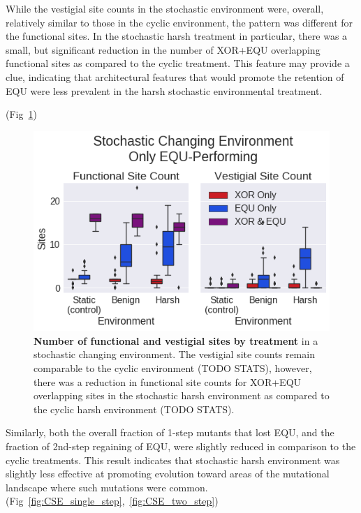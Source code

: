 \documentclass[10pt,letterpaper]{article}
\begin{document}
While the vestigial site counts in the stochastic environment were, overall, relatively similar to those in the cyclic environment, the pattern was different for the functional sites. In the stochastic harsh treatment in particular, there was a small, but significant reduction in the number of XOR+EQU overlapping functional sites as compared to the cyclic treatment. This feature may provide a clue, indicating that architectural features that would promote the retention of EQU were less prevalent in the harsh stochastic environmental treatment.

(Fig~\ref{fig:CSE_func_vestigial})

\begin{figure}[!h]
\includegraphics[trim={0 0 0 0}, clip, width=1\columnwidth]{figures/CSE_func_vest__filtered__box.png}
\caption{{\bf Number of functional and vestigial sites by treatment} in a stochastic changing environment. The vestigial site counts remain comparable to the cyclic environment (TODO STATS), however, there was a reduction in functional site counts for XOR+EQU overlapping sites in the stochastic harsh environment as compared to the cyclic harsh environment (TODO STATS).%
}
\label{fig:CSE_func_vestigial} %
\end{figure}

Similarly, both the overall fraction of 1-step mutants that lost EQU, and the fraction of 2nd-step regaining of EQU, were slightly reduced in comparison to the cyclic treatments.
This result indicates that stochastic harsh environment was slightly less effective at promoting evolution toward areas of the mutational landscape where such mutations were common.
(Fig~\ref{fig:CSE_single_step},~\ref{fig:CSE_two_step})
\end{document}
